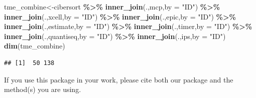 \documentclass[
  12pt,
]{book}
\newenvironment{Shaded}{\begin{snugshade}}{\end{snugshade}}
\newcommand{\AttributeTok}[1]{\textcolor[rgb]{0.13,0.29,0.53}{#1}}
\newcommand{\FunctionTok}[1]{\textcolor[rgb]{0.13,0.29,0.53}{\textbf{#1}}}
\newcommand{\NormalTok}[1]{#1}
\newcommand{\OtherTok}[1]{\textcolor[rgb]{0.56,0.35,0.01}{#1}}
\newcommand{\SpecialCharTok}[1]{\textcolor[rgb]{0.81,0.36,0.00}{\textbf{#1}}}
\newcommand{\StringTok}[1]{\textcolor[rgb]{0.31,0.60,0.02}{#1}}
\theoremstyle{definition}
\theoremstyle{definition}
\theoremstyle{definition}
\theoremstyle{definition}
\theoremstyle{remark}
\begin{document}
\begin{Shaded}
\begin{Highlighting}[]
\NormalTok{tme\_combine}\OtherTok{\textless{}{-}}\NormalTok{cibersort }\SpecialCharTok{\%\textgreater{}\%} 
  \FunctionTok{inner\_join}\NormalTok{(.,mcp,}\AttributeTok{by       =} \StringTok{"ID"}\NormalTok{) }\SpecialCharTok{\%\textgreater{}\%} 
  \FunctionTok{inner\_join}\NormalTok{(.,xcell,}\AttributeTok{by     =} \StringTok{"ID"}\NormalTok{) }\SpecialCharTok{\%\textgreater{}\%}
  \FunctionTok{inner\_join}\NormalTok{(.,epic,}\AttributeTok{by      =} \StringTok{"ID"}\NormalTok{) }\SpecialCharTok{\%\textgreater{}\%} 
  \FunctionTok{inner\_join}\NormalTok{(.,estimate,}\AttributeTok{by  =} \StringTok{"ID"}\NormalTok{) }\SpecialCharTok{\%\textgreater{}\%} 
  \FunctionTok{inner\_join}\NormalTok{(.,timer,}\AttributeTok{by     =} \StringTok{"ID"}\NormalTok{) }\SpecialCharTok{\%\textgreater{}\%} 
  \FunctionTok{inner\_join}\NormalTok{(.,quantiseq,}\AttributeTok{by =} \StringTok{"ID"}\NormalTok{) }\SpecialCharTok{\%\textgreater{}\%} 
  \FunctionTok{inner\_join}\NormalTok{(.,ips,}\AttributeTok{by       =} \StringTok{"ID"}\NormalTok{)}
\FunctionTok{dim}\NormalTok{(tme\_combine)}
\end{Highlighting}
\end{Shaded}

\begin{verbatim}
## [1]  50 138
\end{verbatim}

If you use this package in your work, please cite both our package and the method(s) you are using.
\end{document}
